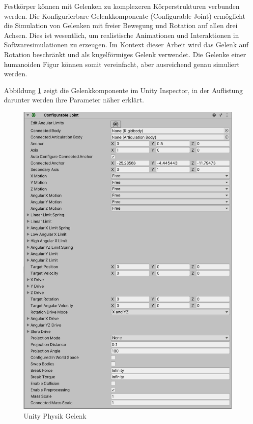 Festkörper können mit Gelenken zu komplexeren Körperstrukturen verbunden werden. Die Konfigurierbare Gelenkkomponente (Configurable Joint) ermöglicht die Simulation von Gelenken mit freier Bewegung und Rotation auf allen drei Achsen. Dies ist wesentlich, um realistische Animationen und Interaktionen in Softwaresimulationen zu erzeugen. Im Kontext dieser Arbeit wird das Gelenk auf Rotation beschränkt und als kugelförmiges Gelenk verwendet. Die Gelenke einer humanoiden Figur können somit vereinfacht, aber ausreichend genau simuliert werden.

Abbildung \ref{fig:komponente_configurable_joint} zeigt die Gelenkkomponente im Unity Inspector, in der Auflistung darunter werden ihre Parameter näher erklärt.

\begin{figure}[H]
  \centering
  \includegraphics[scale=0.5]{img/komponente_configurable_joint}
  \caption{Unity Physik Gelenk}
  \label{fig:komponente_configurable_joint}
\end{figure}
